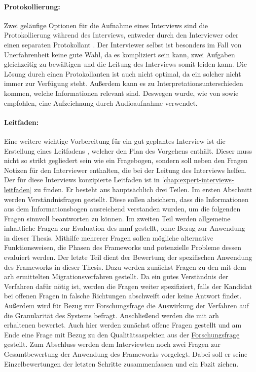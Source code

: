 \paragraph{Protokollierung:} Zwei geläufige Optionen für die Aufnahme eines Interviews sind die Pro\-to\-kol\-lie\-rung während des Interviews, entweder durch den Interviewer oder einen separaten Protokollant \cite{seaman2008qualitative,Runeson2009}.
Der Interviewer selbst ist besonders im Fall von Unerfahrenheit keine gute Wahl, da es kompliziert sein kann, zwei Aufgaben gleichzeitig zu bewältigen und die Leitung des Interviews somit leiden kann.
Die Lösung durch einen Protokollanten ist auch nicht optimal, da ein solcher nicht immer zur Verfügung steht.
Außerdem kann es zu Interpretationsunterschieden kommen, welche Informationen relevant sind.
Deswegen wurde, wie von  sowie  empfohlen, eine Aufzeichnung durch Audioaufnahme verwendet.

\paragraph{Leitfaden:} Eine weitere wichtige Vorbereitung für ein gut geplantes Interview ist die Erstellung eines Leitfadens \cite{seaman2008qualitative,hove-anda-2005}, welcher den Plan des Vorgehens enthält.
Dieser muss nicht so strikt gegliedert sein wie ein Fragebogen, sondern soll neben den Fragen Notizen für den Interviewer enthalten, die bei der Leitung des Interviews helfen.
Der für diese Interviews konzipierte Leitfaden ist in \cref{chap:expert-interviews-leitfaden} zu finden.
Er besteht aus hauptsächlich drei Teilen.
Im ersten Abschnitt werden Verständnisfragen gestellt.
Diese sollen absichern, dass die Informationen aus dem Informationsbogen ausreichend verstanden wurden, um die folgenden Fragen sinnvoll beantworten zu können.
Im zweiten Teil werden allgemeine inhaltliche Fragen zur Evaluation des \gls{mmf} gestellt, ohne Bezug zur Anwendung in dieser Thesis.
Mithilfe mehrerer Fragen sollen mögliche alternative Funktionsweisen, die Phasen des Frameworks und potenzielle Probleme dessen evaluiert werden.
Der letzte Teil dient der Bewertung der spezifischen Anwendung des Frameworks in dieser Thesis.
Dazu werden zunächst Fragen zu den mit dem \gls{arh} ermittelten Migrationsverfahren gestellt.
Da ein gutes Verständnis der Verfahren dafür nötig ist, werden die Fragen weiter spezifiziert, falls der Kandidat bei offenen Fragen in falsche Richtungen abschweift oder keine Antwort findet.
Außerdem wird für Bezug zur \hyperref[forschungsfrage:1]{Forschungsfrage} die Auswirkung der Verfahren auf die Granularität des Systems befragt.
Anschließend werden die mit \gls{arh} erhaltenen \bpp bewertet.
Auch hier werden zunächst offene Fragen gestellt und am Ende eine Frage mit Bezug zu den Qualitätsaspekten aus der \hyperref[forschungsfrage:1]{Forschungsfrage} gestellt.
Zum Abschluss werden dem Interviewten noch zwei Fragen zur Gesamtbewertung der Anwendung des Frameworks vorgelegt.
Dabei soll er seine Einzelbewertungen der letzten Schritte zusammenfassen und ein Fazit ziehen.

